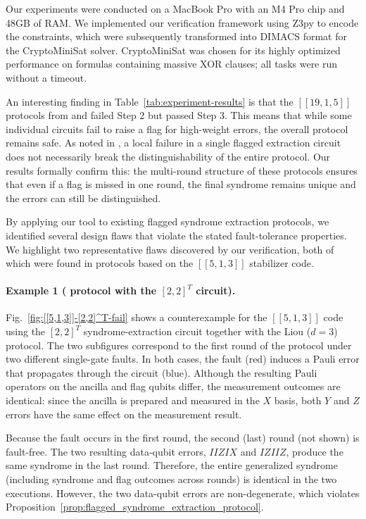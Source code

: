 \documentclass[acmsmall,screen,review,anonymous,nonacm]{acmart}
\begin{document}
Our experiments were conducted on a MacBook Pro with an M4 Pro chip and 48GB of RAM. We implemented our verification framework using Z3py to encode the constraints, which were subsequently transformed into DIMACS format for the CryptoMiniSat solver. CryptoMiniSat was chosen for its highly optimized performance on formulas containing massive XOR clauses; all tasks were run without a timeout. 

An interesting finding in Table~\ref{tab:experiment-results} is that the $[[19,1,5]]$ protocols from \cite{Liou25} and \cite{Du24} failed Step 2 but passed Step 3. This means that while some individual circuits fail to raise a flag for high-weight errors, the overall protocol remains safe. As noted in \cite{Liou25, Du24}, a local failure in a single flagged extraction circuit does not necessarily break the distinguishability of the entire protocol. Our results formally confirm this: the multi-round structure of these protocols ensures that even if a flag is missed in one round, the final syndrome remains unique and the errors can still be distinguished.


By applying our tool to existing flagged syndrome extraction protocols, we identified several design flaws that violate the stated fault-tolerance properties. We highlight two representative flaws discovered by our verification, both of which were found in protocols based on the $[[5,1,3]]$ stabilizer code. 

\paragraph{Example 1 (\cite{Liou25} protocol with the $[2,2]^T$ circuit).}
Fig.~\ref{fig:[[5,1,3]]-[2,2]^T-fail} shows a counterexample for the $[[5,1,3]]$
code using the $[2,2]^T$ syndrome-extraction circuit together with the Liou
($d=3$) protocol. The two subfigures correspond to the first round of the
protocol under two different single-gate faults. In both cases, the fault (red)
induces a Pauli error that propagates through the circuit (blue). Although the
resulting Pauli operators on the ancilla and flag qubits differ, the measurement
outcomes are identical: since the ancilla is prepared and measured in the $X$
basis, both $Y$ and $Z$ errors have the same effect on the measurement result.

Because the fault occurs in the first round, the second (last) round (not shown) is
fault-free. The two resulting data-qubit errors, $IIZIX$ and $IZIIZ$, produce the
same syndrome in the last round. Therefore, the entire generalized
syndrome (including syndrome and flag outcomes across rounds) is identical in
the two executions. However, the two data-qubit errors are non-degenerate, which
violates Proposition~\ref{prop:flagged_syndrome_extraction_protocol}.
\end{document}
